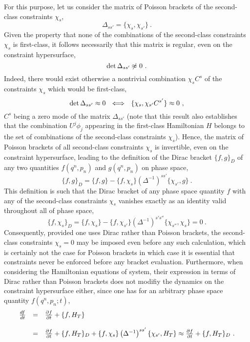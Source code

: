 \documentclass[a4paper,11pt]{article}
\begin{document}
For this purpose, let us consider the matrix of Poisson brackets of the
second-class constraints $\chi_s$,
\begin{equation}
\Delta_{ss'}=\{\chi_s,\chi_{s'}\}\ .
\end{equation}
Given the property that none of the combinations of the second-class
constraints $\chi_s$ is first-class, it follows necessarily that this
matrix is regular, even on the constraint hypersurface,
\begin{equation}
{\rm det}\,\Delta_{ss'}\not{\!\!\approx}\ 0\ .
\end{equation}
Indeed, there would exist otherwise a nontrivial combination $\chi_sC^s$
of the constraints $\chi_s$ which would be first-class,
\begin{equation}
{\rm det}\,\Delta_{ss'}\approx 0\ \ 
\Longleftrightarrow\ \ \{\chi_s,\chi_{s'}C^{s'}\}\approx 0\ ,
\end{equation}
$C^s$ being a zero mode of the matrix $\Delta_{ss'}$
(note that this result also establishes that the combination $U^j\phi_j$
appearing in the first-class Hamiltonian $H$ belongs to the set of
combinations of the second-class constraints $\chi_s$).
Hence, the matrix of Poisson brackets of all second-class constraints
$\chi_s$ is invertible, even on the constraint hypersurface, leading
to the definition of the Dirac bracket $\{f,g\}_D$ of any two quantities
$f(q^n,p_n)$ and $g(q^n,p_n)$ on phase space,
\begin{equation}
\{f,g\}_D=\{f,g\}-\{f,\chi_s\}\left(\Delta^{-1}\right)^{ss'}
\{\chi_{s'},g\}\ .
\end{equation}
This definition is such that the Dirac bracket of any phase space quantity $f$
with any of the second-class constraints $\chi_s$ vanishes exactly as an
identity valid throughout all of phase space,
\begin{equation}
\{f,\chi_s\}_D=\{f,\chi_s\}-\{f,\chi_{s'}\}\left(\Delta^{-1}\right)^{s's''}
\{\chi_{s''},\chi_s\}=0\ .
\end{equation}
Consequently, provided one uses Dirac rather than Poisson brackets,
the second-class constraints $\chi_s=0$ may be imposed even before
any such calculation, which is certainly not the case for Poisson brackets
in which case it is essential that constraints never be enforced before any
bracket evaluation. Furthermore, when considering the Hamiltonian equations
of system, their expression in terms of Dirac rather than Poisson brackets
does not modifiy the dynamics on the constraint hypersurface either, since
one has for an arbitrary phase space quantity $f(q^n,p_n;t)$,
\begin{equation}
\begin{array}{r c l}
\frac{df}{dt}&=&\frac{\partial f}{\partial t}+\{f,H_T\}\\
 & & \\
&=&\frac{\partial f}{\partial t}+\{f,H_T\}_D+
\{f,\chi_s\}\left(\Delta^{-1}\right)^{ss'}\{\chi_{s'},H_T\}\approx
\frac{\partial f}{\partial t}+\{f,H_T\}_D\ .
\end{array}
\end{equation}
\end{document}
